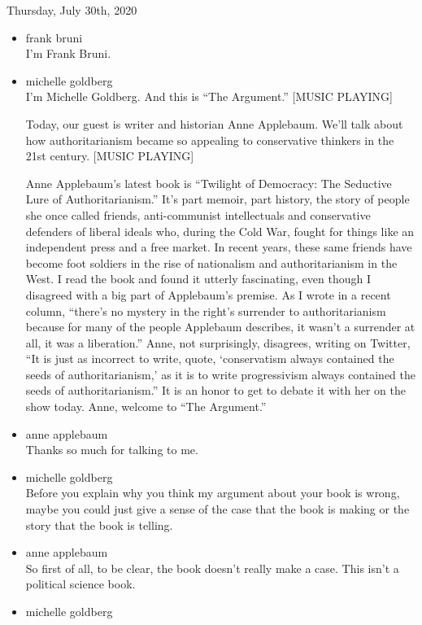 Thursday, July 30th, 2020

\begin{itemize}
\item
  frank bruni\\
  I'm Frank Bruni.
\item
  michelle goldberg\\
  I'm Michelle Goldberg. And this is ``The Argument.'' {[}MUSIC
  PLAYING{]}

  Today, our guest is writer and historian Anne Applebaum. We'll talk
  about how authoritarianism became so appealing to conservative
  thinkers in the 21st century. {[}MUSIC PLAYING{]}

  Anne Applebaum's latest book is ``Twilight of Democracy: The Seductive
  Lure of Authoritarianism.'' It's part memoir, part history, the story
  of people she once called friends, anti-communist intellectuals and
  conservative defenders of liberal ideals who, during the Cold War,
  fought for things like an independent press and a free market. In
  recent years, these same friends have become foot soldiers in the rise
  of nationalism and authoritarianism in the West. I read the book and
  found it utterly fascinating, even though I disagreed with a big part
  of Applebaum's premise. As I wrote in a recent column, ``there's no
  mystery in the right's surrender to authoritarianism because for many
  of the people Applebaum describes, it wasn't a surrender at all, it
  was a liberation.'' Anne, not surprisingly, disagrees, writing on
  Twitter, ``It is just as incorrect to write, quote, `conservatism
  always contained the seeds of authoritarianism,' as it is to write
  progressivism always contained the seeds of authoritarianism.'' It is
  an honor to get to debate it with her on the show today. Anne, welcome
  to ``The Argument.''
\item
  anne applebaum\\
  Thanks so much for talking to me.
\item
  michelle goldberg\\
  Before you explain why you think my argument about your book is wrong,
  maybe you could just give a sense of the case that the book is making
  or the story that the book is telling.
\item
  anne applebaum\\
  So first of all, to be clear, the book doesn't really make a case.
  This isn't a political science book.
\item
  michelle goldberg\\

\end{itemize}
